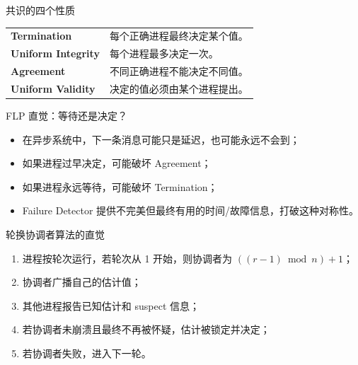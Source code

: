 \documentclass[UTF8,fontset=none,aspectratio=169,10pt]{beamer}
\begin{document}

\begin{frame}{共识的四个性质}
\begin{tabularx}{\linewidth}{>{\bfseries}p{2.9cm}X}
\toprule
Termination & 每个正确进程最终决定某个值。 \\
Uniform Integrity & 每个进程最多决定一次。 \\
Agreement & 不同正确进程不能决定不同值。 \\
Uniform Validity & 决定的值必须由某个进程提出。 \\
\bottomrule
\end{tabularx}
\vfill
{}
\end{frame}

\begin{frame}{FLP 直觉：等待还是决定？}
\begin{itemize}
  \item 在异步系统中，下一条消息可能只是延迟，也可能永远不会到；
  \item 如果进程过早决定，可能破坏 Agreement；
  \item 如果进程永远等待，可能破坏 Termination；
  \item Failure Detector 提供不完美但最终有用的时间/故障信息，打破这种对称性。
\end{itemize}
\end{frame}

\begin{frame}{轮换协调者算法的直觉}
\begin{enumerate}
  \item 进程按轮次运行，若轮次从 1 开始，则协调者为 $((r-1)\bmod n)+1$；
  \item 协调者广播自己的估计值；
  \item 其他进程报告已知估计和 suspect 信息；
  \item 若协调者未崩溃且最终不再被怀疑，估计被锁定并决定；
  \item 若协调者失败，进入下一轮。
\end{enumerate}
\vfill
{}
\end{frame}
\end{document}
